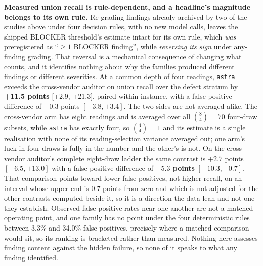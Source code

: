 \textbf{Measured union recall is rule-dependent, and a headline's magnitude belongs to its own
rule.} Re-grading findings already archived by two of the studies above under four decision
rules, with no new model calls, leaves the shipped BLOCKER threshold's estimate intact for its own
rule, which \emph{was} preregistered as ``$\geq 1$ BLOCKER finding'', while \emph{reversing its
sign} under any-finding grading. That reversal is a mechanical consequence of changing what
counts, and it identifies nothing about why the families produced different findings or
different severities. At a common depth of four readings, \texttt{astra} exceeds the
cross-vendor auditor on union recall over the defect stratum by \textbf{+11.5 points} [+2.9,
+21.3], paired within instance, with a false-positive difference of $-0.3$ points
$[-3.8, +3.4]$. The two sides are not averaged alike. The cross-vendor arm has eight readings and
is averaged over all $\binom{8}{4}=70$ four-draw subsets, while \texttt{astra} has exactly four,
so $\binom{4}{4}=1$ and its estimate is a single realisation with none of its reading-selection
variance averaged out; one arm's luck in four draws is fully in the number and the other's is not.
On the cross-vendor auditor's complete eight-draw ladder the same contrast is $+2.7$ points
$[-6.5, +13.0]$ with a false-positive difference of \textbf{$-5.3$ points} $[-10.3, -0.7]$. That
comparison points toward lower false positives, not higher recall, on an interval whose upper end
is 0.7 points from zero and which is not adjusted for the other contrasts computed beside it, so
it is a direction the data lean and not one they establish. Observed false-positive rates near one
another are not a matched operating point, and one family has no point under the four
deterministic rules between 3.3\% and 34.0\% false positives, precisely where a matched comparison
would sit, so its ranking is bracketed rather than measured. Nothing here assesses finding content
against the hidden failure, so none of it speaks to what any finding identified.

